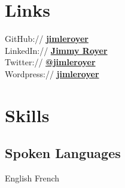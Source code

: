 \documentclass[letterpaper]{deedy-resume} %
\begin{document}



\begin{minipage}[t]{0.33\textwidth} %


\section{Links}

GitHub:// \href{https://github.com/jimleroyer/}{\bf jimleroyer} \\
LinkedIn:// \href{https://ca.linkedin.com/in/jimleroyer/}{\bf Jimmy Royer} \\
Twitter:// \href{https://twitter.com/jimleroyer}{\bf @jimleroyer} \\
Wordpress:// \href{http://jimleroyer.wordpress.com/}{\bf jimleroyer}

\sectionspace %


\section{Skills}

\subsection{Spoken Languages}

English \textbullet{} French


\end{minipage}
\end{document}
